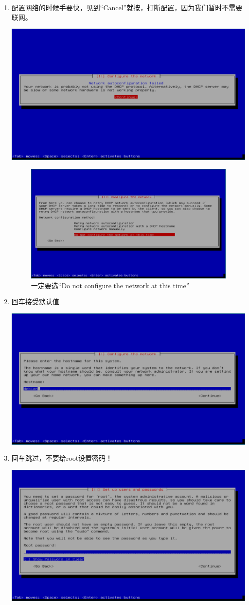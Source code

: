 \documentclass{wx672ctexart} \usepackage{hyperref}
\begin{document}
\begin{enumerate}
\item 配置网络的时候手要快，见到“Cancel”就按，打断配置，因为我们暂时不需要联网。

\begin{center}
\includegraphics[width=.5\linewidth]{screenshots/05.png}
\end{center}

\begin{figure}[htbp]
\centering
\includegraphics[width=.5\linewidth]{screenshots/06.png}
\caption{一定要选“Do not configure the network at this time”}
\end{figure}

\item 回车接受默认值

\begin{center}
\includegraphics[width=.5\linewidth]{screenshots/07.png}
\end{center}

\item 回车跳过，不要给root设置密码！

\begin{center}
\includegraphics[width=.5\linewidth]{screenshots/08.png}
\end{center}


\end{enumerate}
\end{document}
